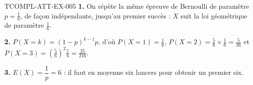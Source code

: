 \begin{corrige}{TCOMPL-ATT-EX-005}
\textbf{1.} On répète la même épreuve de Bernoulli de paramètre
$p=\tfrac16$, de façon indépendante, jusqu'au premier succès : $X$ suit la loi
géométrique de paramètre $\tfrac16$.

\textbf{2.} $P(X=k)=(1-p)^{k-1}p$, d'où $P(X=1)=\tfrac16$,
$P(X=2)=\tfrac56\times\tfrac16=\tfrac{5}{36}$ et
$P(X=3)=\left(\tfrac56\right)^2\tfrac16=\tfrac{25}{216}$.

\textbf{3.} $E(X)=\dfrac1p=6$ : il faut en moyenne six lancers pour obtenir un
premier six.
\end{corrige}
